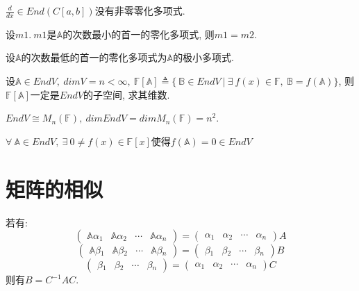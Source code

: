 \begin{example}
    $\frac{d}{dx}\in End(C[a,b])$没有非零零化多项式.
\end{example}

\begin{lemma}[极小多项式的唯一性]
    设$m1. \ m1$是$\mathbb{A}$的次数最小的首一的零化多项式, 则$m1=m2$.
\end{lemma}

\begin{definition}[极小多项式]
    设$\mathbb{A}$的次数最低的首一的零化多项式为$\mathbb{A}$的极小多项式.
\end{definition}

\begin{example}
    设$\mathbb{A}\in EndV, \ dimV=n<\infty, \ \mathbb{F}[\mathbb{A}]\triangleq \{\ \mathbb{B}\in EndV\ |\ \exists \ f(x)\in \mathbb{F}, \ \mathbb{B}=f(\mathbb{A})\}$, 则$\mathbb{F}[\mathbb{A}]$一定是$EndV$的子空间, 求其维数.
\end{example}

\begin{theorem}
    $EndV\cong M_n(\mathbb{F}), \ dimEndV=dimM_n(\mathbb{F})=n^2$.
\end{theorem}

\begin{inference}
    $\forall \ \mathbb{A}\in EndV, \ \exists \ 0\ne f(x)\in\mathbb{F}[x]$使得$f(\mathbb{A})=0\in EndV$
\end{inference}

\section{ 矩阵的相似 }

\begin{lemma}
    若有:
    \[\begin{pmatrix}
        \mathbb{A}\alpha{_1} & \mathbb{A}\alpha{_2} & \cdots & \mathbb{A}\alpha{_n}
    \end{pmatrix}=\begin{pmatrix}
        \alpha{_1} & \alpha{_2} & \cdots & \alpha{_n}
    \end{pmatrix}A\]
    \[\begin{pmatrix}
        \mathbb{A}\beta{_1} & \mathbb{A}\beta{_2} & \cdots & \mathbb{A}\beta{_n}
    \end{pmatrix}=\begin{pmatrix}
        \beta{_1} & \beta{_2} & \cdots & \beta{_n}
    \end{pmatrix}B\]
    \[\begin{pmatrix}
        \beta{_1} & \beta{_2} & \cdots & \beta{_n}
    \end{pmatrix}=\begin{pmatrix}
        \alpha{_1} & \alpha{_2} & \cdots & \alpha{_n}
    \end{pmatrix}C\]
    则有$B=C^{-1}AC$.
\end{lemma}


